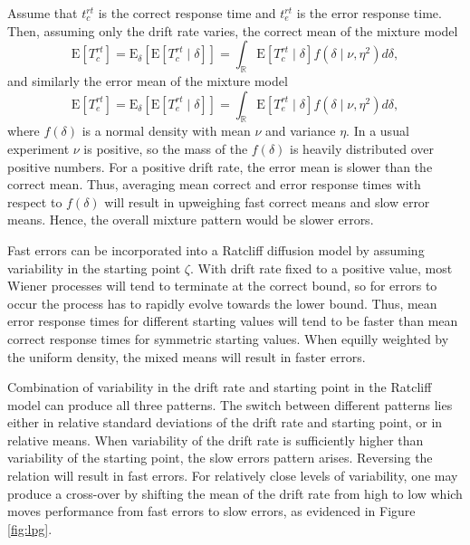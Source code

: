 \documentclass[12pt]{report}
\begin{document}
Assume that $t_c^{rt}$ is the correct response time and $t_e^{rt}$ is the error response time. Then, assuming only the drift rate varies, the correct mean of the mixture model
\begin{equation}
\mathrm{E}\left[T_c^{rt}\right] = \mathrm{E}_\delta\left[\mathrm{E}\left[T_c^{rt} \mid \delta\right]\right] = \int_\mathbb{R}\mathrm{E}\left[T_c^{rt} \mid \delta\right] f(\delta \mid \nu, \eta^2)d\delta,
\end{equation}
and similarly the error mean of the mixture model
\begin{equation}
\mathrm{E}\left[T_e^{rt}\right] = \mathrm{E}_\delta\left[\mathrm{E}\left[T_e^{rt} \mid \delta\right]\right] = \int_\mathbb{R}\mathrm{E}\left[T_e^{rt} \mid \delta\right] f(\delta \mid \nu, \eta^2)d\delta,
\end{equation}
where $f(\delta)$ is a normal density with mean $\nu$ and variance $\eta$. In a usual experiment $\nu$ is positive, so the mass of the $f(\delta)$ is heavily distributed over positive numbers. For a positive drift rate, the error mean is slower than the correct mean.  Thus, averaging mean correct and error response times with respect to $f(\delta)$ will result in upweighing fast correct means and slow error means. Hence, the overall mixture pattern would be slower errors.

Fast errors can be incorporated into a Ratcliff diffusion model by assuming variability in the starting point $\zeta$. With drift rate fixed to a positive value, most Wiener processes will tend to terminate at the correct bound, so for errors to occur the process has to rapidly evolve towards the lower bound. Thus, mean error response times for different starting values will tend to be faster than mean correct response times for symmetric starting values. When equilly weighted by the uniform density, the mixed means will result in faster errors.

Combination of variability in the drift rate and starting point in the Ratcliff model can produce all three patterns. The switch between different patterns lies either in relative standard deviations of the drift rate and starting point, or in relative means. When variability of the drift rate is sufficiently higher than variability of the starting point, the slow errors pattern arises. Reversing the relation will result in fast errors. For relatively close levels of variability, one may produce a cross-over by shifting the mean of the drift rate from high to low which moves performance from fast errors to slow errors, as evidenced in Figure \ref{fig:lpg}.
\end{document}
